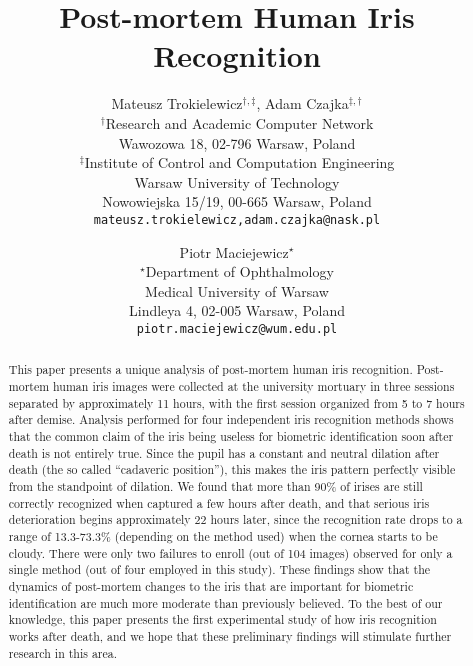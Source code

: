 \documentclass[10pt,twocolumn,letterpaper]{article}
\begin{document}
\title{Post-mortem Human Iris Recognition}

\author{Mateusz Trokielewicz$^{\dag,\ddag}$, Adam Czajka$^{\ddag,\dag}$\\
$^{\dag}$Research and Academic Computer Network\\
Wawozowa 18, 02-796 Warsaw, Poland\\
$^{\ddag}$Institute of Control and Computation Engineering\\
Warsaw University of Technology\\
Nowowiejska 15/19, 00-665 Warsaw, Poland\\
{\tt\small {mateusz.trokielewicz,adam.czajka}@nask.pl}
\and
Piotr Maciejewicz$^{\star}$\\
$^{\star}$Department of Ophthalmology\\
Medical University of Warsaw\\
Lindleya 4, 02-005 Warsaw, Poland\\
{\tt\small piotr.maciejewicz@wum.edu.pl}
}

\maketitle
\thispagestyle{empty}


\begin{abstract}
This paper presents a unique analysis of post-mortem human iris recognition. Post-mortem human iris images were collected at the university mortuary in three sessions separated by approximately 11 hours, with the first session organized from 5 to 7 hours after demise. Analysis performed for four independent iris recognition methods shows that the common claim of the iris being useless for biometric identification soon after death is not entirely true. Since the pupil has a constant and neutral dilation after death (the so called ``cadaveric position''), this makes the iris pattern perfectly visible from the standpoint of dilation. We found that more than 90\% of irises are still correctly recognized when captured a few hours after death, and that serious iris deterioration begins approximately 22 hours later, since the recognition rate drops to a range of 13.3-73.3\% (depending on the method used) when the cornea starts to be cloudy. There were only two failures to enroll (out of 104 images) observed for only a single method (out of four employed in this study). These findings show that the dynamics of post-mortem changes to the iris that are important for biometric identification are much more moderate than previously believed. To the best of our knowledge, this paper presents the first experimental study of how iris recognition works after death, and we hope that these preliminary findings will stimulate further research in this area.
\end{abstract}
\end{document}

